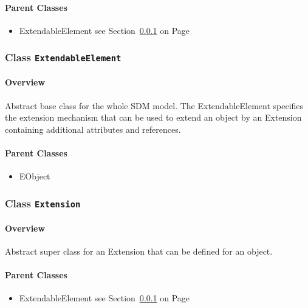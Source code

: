 \paragraph{Parent Classes}
\begin{itemize}
\item ExtendableElement see Section~\ref{cls:modeling::ExtendableElement} on Page~\pageref{cls:modeling::ExtendableElement}\end{itemize}
\subsubsection{\Large{Class \bfseries \texttt{ExtendableElement}\normalfont}}
\label{cls:modeling::ExtendableElement} 
\paragraph{Overview}

	
			
Abstract base class for the whole SDM model. The ExtendableElement specifies the extension mechanism that can be used to extend an object by an Extension containing additional attributes and references.	
		
	



\paragraph{Parent Classes}
\begin{itemize}
\item EObject \end{itemize}
\subsubsection{\Large{Class \bfseries \texttt{Extension}\normalfont}}
\label{cls:modeling::Extension} 
\paragraph{Overview}

	
			
Abstract super class for an Extension that can be defined for an object.	
		
	



\paragraph{Parent Classes}
\begin{itemize}
\item ExtendableElement see Section~\ref{cls:modeling::ExtendableElement} on Page~\pageref{cls:modeling::ExtendableElement}\end{itemize}
